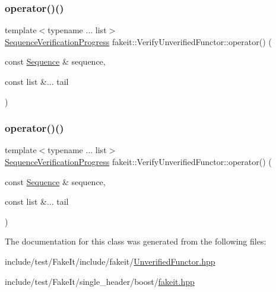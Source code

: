 \subsubsection{\texorpdfstring{operator()()}{operator()()}\hspace{0.1cm}{\footnotesize\ttfamily [8/9]}}
{\footnotesize\ttfamily template$<$typename ... list$>$ \\
\mbox{\hyperlink{classfakeit_1_1SequenceVerificationProgress}{Sequence\+Verification\+Progress}} fakeit\+::\+Verify\+Unverified\+Functor\+::operator() (\begin{DoxyParamCaption}\item[{const \mbox{\hyperlink{classfakeit_1_1Sequence}{Sequence}} \&}]{sequence,  }\item[{const list \&...}]{tail }\end{DoxyParamCaption})\hspace{0.3cm}{\ttfamily [inline]}}

\mbox{\label{classfakeit_1_1VerifyUnverifiedFunctor_ac32fd9aaa7de99c3b6b89c39b642ecad}} 
\subsubsection{\texorpdfstring{operator()()}{operator()()}\hspace{0.1cm}{\footnotesize\ttfamily [9/9]}}
{\footnotesize\ttfamily template$<$typename ... list$>$ \\
\mbox{\hyperlink{classfakeit_1_1SequenceVerificationProgress}{Sequence\+Verification\+Progress}} fakeit\+::\+Verify\+Unverified\+Functor\+::operator() (\begin{DoxyParamCaption}\item[{const \mbox{\hyperlink{classfakeit_1_1Sequence}{Sequence}} \&}]{sequence,  }\item[{const list \&...}]{tail }\end{DoxyParamCaption})\hspace{0.3cm}{\ttfamily [inline]}}



The documentation for this class was generated from the following files\+:\begin{DoxyCompactItemize}
\item 
include/test/\+Fake\+It/include/fakeit/\mbox{\hyperlink{UnverifiedFunctor_8hpp}{Unverified\+Functor.\+hpp}}\item 
include/test/\+Fake\+It/single\+\_\+header/boost/\mbox{\hyperlink{single__header_2boost_2fakeit_8hpp}{fakeit.\+hpp}}\end{DoxyCompactItemize}
